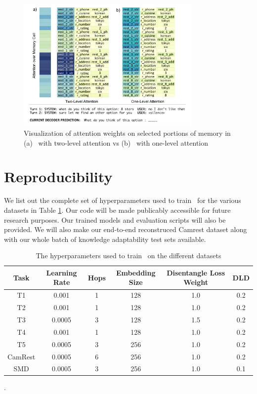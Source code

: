 \begin{figure}
\centering
\includegraphics[width=0.8\textwidth]{assets/task3_two_level.png}
\caption{Visualization of attention weights on selected portions of memory in (a) \sys\ with two-level attention vs (b) \sys\ with one-level attention}
\label{fig:attention}
\end{figure}

\section{Reproducibility}
\label{sec:reproduce}
We list out the complete set of hyperparameters used to train \sys\ for the various datasets in Table \ref{tab:params}. Our code will be made publicably accessible for future research purposes. Our trained models and evaluation scripts will also be provided. We will also make our end-to-end reconstruced Camrest dataset along with our whole batch of knowledge adaptability test sets available.

\begin{table}[ht]
\centering
\footnotesize
\begin{tabular}{c|ccccc}
\toprule
\textbf{Task} & \textbf{Learning Rate} & \textbf{Hops} &  \textbf{Embedding Size} & \textbf{Disentangle Loss Weight} & \textbf{DLD}\\
\midrule
T1 & 0.001 & 1 & 128 & 1.0 & 0.2 \\
T2 & 0.001 & 1 & 128 & 1.0 & 0.2 \\
T3 & 0.0005 & 3 & 128 & 1.5 & 0.2 \\
T4 & 0.001 & 1 & 128 & 1.0 & 0.2 \\
T5 & 0.0005 & 3 & 256 & 1.0 & 0.2 \\
CamRest & 0.0005 & 6 & 256 & 1.0 & 0.2 \\
SMD & 0.0005 & 3 & 256 & 1.0 & 0.1 \\
\bottomrule 
\end{tabular}
\caption{The hyperparameters used to train \sys\ on the different datasets}. 
\label{tab:params}
\end{table}

